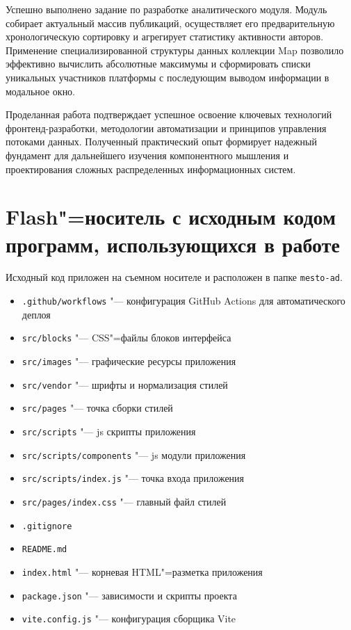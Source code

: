 \documentclass[bachelor, och, pract, times]{SCWorks}
\begin{document}
Успешно выполнено задание по разработке аналитического модуля. Модуль собирает
актуальный массив публикаций, осуществляет его предварительную хронологическую
сортировку и агрегирует статистику активности авторов. Применение
специализированной структуры данных коллекции Map позволило эффективно
вычислить абсолютные максимумы и сформировать списки уникальных участников
платформы с последующим выводом информации в модальное окно.

Проделанная работа подтверждает успешное освоение ключевых технологий
фронтенд-разработки, методологии автоматизации и принципов управления потоками
данных. Полученный практический опыт формирует надежный фундамент для
дальнейшего изучения компонентного мышления и проектирования сложных
распределенных информационных систем.





\appendix

\section{Flash"=носитель с исходным кодом программ, использующихся в работе}
Исходный код приложен на съемном носителе и расположен в папке \texttt{mesto-ad}.

\begin{itemize}
    \item[\textbf{Папка}] \texttt{.github/workflows} "--- конфигурация GitHub Actions для автоматического деплоя
    \item[\textbf{Папка}] \texttt{src/blocks} "--- CSS"=файлы блоков интерфейса
    \item[\textbf{Папка}] \texttt{src/images} "--- графические ресурсы приложения
    \item[\textbf{Папка}] \texttt{src/vendor} "--- шрифты и нормализация стилей
    \item[\textbf{Папка}] \texttt{src/pages} "--- точка сборки стилей
    \item[\textbf{Папка}] \texttt{src/scripts} "--- js скрипты приложения
    \item[\textbf{Папка}] \texttt{src/scripts/components} "--- js модули приложения
    \item[\textbf{Файл}] \texttt{src/scripts/index.js} "--- точка входа приложения
    \item[\textbf{Файл}] \texttt{src/pages/index.css} "--- главный файл стилей
    \item[\textbf{Файл}] \texttt{.gitignore}
    \item[\textbf{Файл}] \texttt{README.md}
    \item[\textbf{Файл}] \texttt{index.html} "--- корневая HTML"=разметка приложения
    \item[\textbf{Файл}] \texttt{package.json} "--- зависимости и скрипты проекта
    \item[\textbf{Файл}] \texttt{vite.config.js} "--- конфигурация сборщика Vite
\end{itemize}
\end{document}
